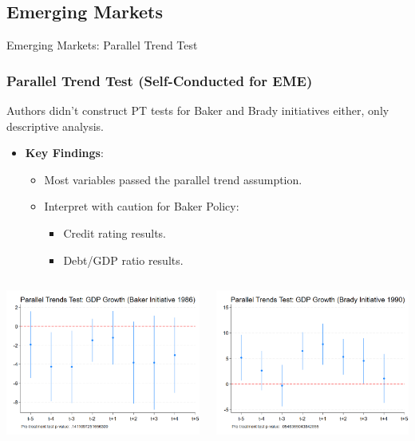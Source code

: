 \documentclass{beamer}
\begin{document}
\subsection{Emerging Markets}
\begin{frame}{Emerging Markets: Parallel Trend Test}
  \frametitle{Parallel Trend Test (Self-Conducted for EME)}
  Authors didn't construct PT tests for Baker and Brady initiatives either, only descriptive analysis.
  \begin{itemize}
    \item \textbf{Key Findings}:
    \begin{itemize}
        \item Most variables passed the parallel trend assumption.
        \item \alert{Interpret with caution for Baker Policy}:
        \begin{itemize}
            \item Credit rating results.
            \item Debt/GDP ratio results.
        \end{itemize}
    \end{itemize}
  \end{itemize}
  \begin{columns}
    \begin{column}{0.5\textwidth}
      \centering \includegraphics[width=0.8\linewidth]{figures/PT_Baker_GDP.png} 
    \end{column}
    \begin{column}{0.5\textwidth}
      \centering \includegraphics[width=0.8\linewidth]{figures/PT_Brady_GDP.png} 

\end{column}
\end{columns}
\end{frame}
\end{document}
